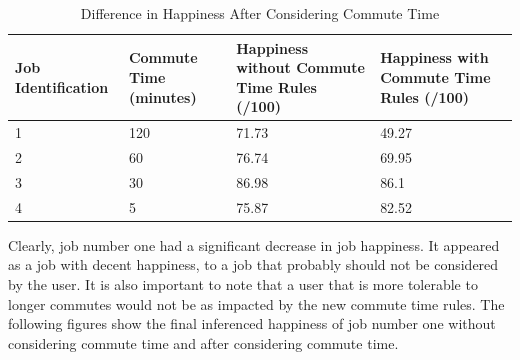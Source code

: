 \documentclass[12pt,fleqn,reqno,letterpaper]{article}
\begin{document}
\begin{table}[h]
  \caption{Difference in Happiness After Considering Commute Time}
  \label{tbl:DISTANCE-DIFF}
  \centering
\begin{tabular}{|p{2cm}|p{4cm}|p{4cm}|p{4cm}|}
\hline
\textbf{Job Identification} & \textbf{Commute Time (minutes)} & \textbf{Happiness without Commute Time Rules (/100)} & \textbf{Happiness with Commute Time Rules (/100)} \\ \hline
1                           & 120                             & 71.73                                                & 49.27                                             \\ \hline
2                           & 60                              & 76.74                                                & 69.95                                             \\ \hline
3                           & 30                              & 86.98                                                & 86.1                                              \\ \hline
4                           & 5                               & 75.87                                                & 82.52                                             \\ \hline
\end{tabular}
\end{table}
Clearly, job number one had a significant decrease in job happiness. It appeared as a job with decent happiness, to a job that probably should not be considered by the user. It is also important to note that a user that is more tolerable to longer commutes would not be as impacted by the new commute time rules. The following figures show the final inferenced happiness of job number one without considering commute time and after considering commute time.
\end{document}
